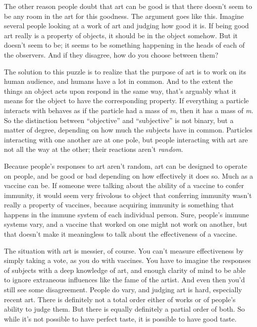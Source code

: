 \documentclass[12pt]{book}
\begin{document}
The other reason people doubt that art can be good is that there doesn't
seem to be any room in the art for this goodness. The argument goes like
this. Imagine several people looking at a work of art and judging how
good it is. If being good art really is a property of objects, it should
be in the object somehow. But it doesn't seem to be; it seems to be
something happening in the heads of each of the observers. And if they
disagree, how do you choose between them?

The solution to this puzzle is to realize that the purpose of art is to
work on its human audience, and humans have a lot in common. And to the
extent the things an object acts upon respond in the same way, that's
arguably what it means for the object to have the corresponding
property. If everything a particle interacts with behaves as if the
particle had a mass of \emph{m}, then it has a mass of \emph{m}. So the
distinction between ``objective'' and ``subjective'' is not binary, but
a matter of degree, depending on how much the subjects have in common.
Particles interacting with one another are at one pole, but people
interacting with art are not all the way at the other; their reactions
aren't \emph{random}.

Because people's responses to art aren't random, art can be designed to
operate on people, and be good or bad depending on how effectively it
does so. Much as a vaccine can be. If someone were talking about the
ability of a vaccine to confer immunity, it would seem very frivolous to
object that conferring immunity wasn't really a property of vaccines,
because acquiring immunity is something that happens in the immune
system of each individual person. Sure, people's immune systems vary,
and a vaccine that worked on one might not work on another, but that
doesn't make it meaningless to talk about the effectiveness of a
vaccine.

The situation with art is messier, of course. You can't measure
effectiveness by simply taking a vote, as you do with vaccines. You have
to imagine the responses of subjects with a deep knowledge of art, and
enough clarity of mind to be able to ignore extraneous influences like
the fame of the artist. And even then you'd still see some disagreement.
People do vary, and judging art is hard, especially recent art. There is
definitely not a total order either of works or of people's ability to
judge them. But there is equally definitely a partial order of both. So
while it's not possible to have perfect taste, it is possible to have
good taste.
\end{document}
